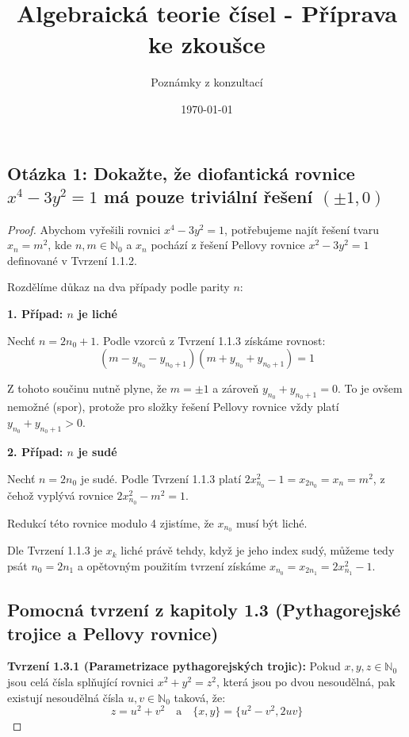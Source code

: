 \documentclass[a4paper,12pt]{article}
\title{Algebraická teorie čísel - Příprava ke zkoušce}
\author{Poznámky z konzultací}
\date{\today}
\begin{document}
\maketitle

\subsection*{Otázka 1: Dokažte, že diofantická rovnice $x^4 - 3y^2 = 1$ má pouze triviální řešení $(\pm 1, 0)$}

\begin{proof}
Abychom vyřešili rovnici $x^4 - 3y^2 = 1$, potřebujeme najít řešení tvaru $x_n = m^2$, kde $n, m \in \mathbb{N}_0$ a $x_n$ pochází z řešení Pellovy rovnice $x^2 - 3y^2 = 1$ definované v Tvrzení 1.1.2.

Rozdělíme důkaz na dva případy podle parity $n$:

\textbf{1. Případ: $n$ je liché}
\vspace{0.5em}

Nechť $n = 2n_0 + 1$. Podle vzorců z Tvrzení 1.1.3 získáme rovnost:
$$(m - y_{n_0} - y_{n_0+1})(m + y_{n_0} + y_{n_0+1}) = 1$$

Z tohoto součinu nutně plyne, že $m = \pm 1$ a zároveň $y_{n_0} + y_{n_0+1} = 0$. To je ovšem nemožné (spor), protože pro složky řešení Pellovy rovnice vždy platí $y_{n_0} + y_{n_0+1} > 0$.

\vspace{1em}
\textbf{2. Případ: $n$ je sudé}
\vspace{0.5em}

Nechť $n = 2n_0$ je sudé. Podle Tvrzení 1.1.3 platí $2x_{n_0}^2 - 1 = x_{2n_0} = x_n = m^2$, z čehož vyplývá rovnice $2x_{n_0}^2 - m^2 = 1$. 

Redukcí této rovnice modulo 4 zjistíme, že $x_{n_0}$ musí být liché. 

Dle Tvrzení 1.1.3 je $x_k$ liché právě tehdy, když je jeho index sudý, můžeme tedy psát $n_0 = 2n_1$ a opětovným použitím tvrzení získáme $x_{n_0} = x_{2n_1} = 2x_{n_1}^2 - 1$.

\subsection*{Pomocná tvrzení z kapitoly 1.3 (Pythagorejské trojice a Pellovy rovnice)}

\textbf{Tvrzení 1.3.1 (Parametrizace pythagorejských trojic):} Pokud $x, y, z \in \mathbb{N}_0$ jsou celá čísla splňující rovnici $x^2 + y^2 = z^2$, která jsou po dvou nesoudělná, pak existují nesoudělná čísla $u, v \in \mathbb{N}_0$ taková, že:
$$z = u^2 + v^2 \quad \text{a} \quad \{x, y\} = \{u^2 - v^2, 2uv\}$$


\end{proof}
\end{document}
